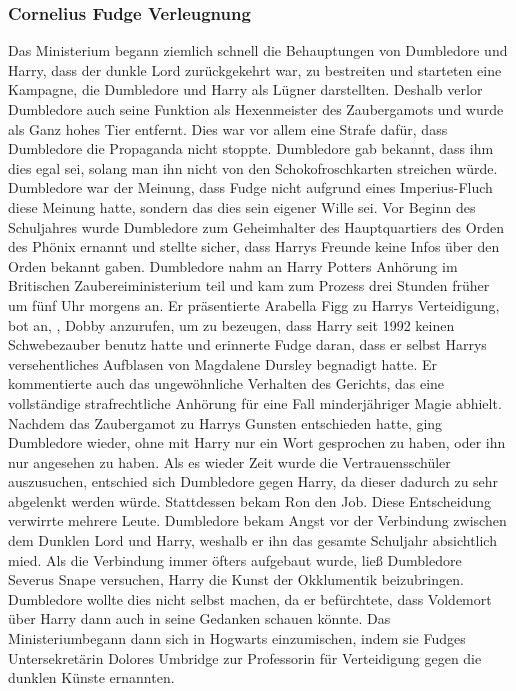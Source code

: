 \documentclass[a4paper, 10pt]{article}
\begin{document}
\subsubsection*{Cornelius Fudge Verleugnung}
Das Ministerium begann ziemlich schnell die Behauptungen von Dumbledore und Harry, dass der dunkle Lord zurückgekehrt war, zu bestreiten und starteten eine Kampagne, die Dumbledore und Harry als Lügner darstellten. Deshalb verlor Dumbledore auch seine Funktion als Hexenmeister des Zaubergamots und wurde als Ganz hohes Tier entfernt. Dies war vor allem eine Strafe dafür, dass Dumbledore die Propaganda nicht stoppte. Dumbledore gab bekannt, dass ihm dies egal sei, solang man ihn nicht von den Schokofroschkarten streichen würde. Dumbledore war der Meinung, dass Fudge nicht aufgrund eines Imperius-Fluch diese Meinung hatte, sondern das dies sein eigener Wille sei.
\vspace{10pt}
\newline
Vor Beginn des Schuljahres wurde Dumbledore zum Geheimhalter des Hauptquartiers des Orden des Phönix ernannt und stellte sicher, dass Harrys Freunde keine Infos über den Orden bekannt gaben.
\vspace{10pt}
\newline
Dumbledore nahm an Harry Potters Anhörung im Britischen Zaubereiministerium teil und kam zum Prozess drei Stunden früher um fünf Uhr morgens an. Er präsentierte Arabella Figg zu Harrys Verteidigung, bot an, , Dobby anzurufen, um zu bezeugen, dass Harry seit 1992 keinen Schwebezauber benutz hatte und erinnerte Fudge daran, dass er selbst Harrys versehentliches Aufblasen von Magdalene Dursley begnadigt hatte. Er kommentierte auch das ungewöhnliche Verhalten des Gerichts, das eine vollständige strafrechtliche Anhörung für eine Fall minderjähriger Magie abhielt. Nachdem das Zaubergamot zu Harrys Gunsten entschieden hatte, ging Dumbledore wieder, ohne mit Harry nur ein Wort gesprochen zu haben, oder ihn nur angesehen zu haben.
\vspace{10pt}
\newline
Als es wieder Zeit wurde die Vertrauensschüler auszusuchen, entschied sich Dumbledore gegen Harry, da dieser dadurch zu sehr abgelenkt werden würde. Stattdessen bekam Ron den Job. Diese Entscheidung verwirrte mehrere Leute.
\vspace{10pt}
\newline
Dumbledore bekam Angst vor der Verbindung zwischen dem Dunklen Lord und Harry, weshalb er ihn das gesamte Schuljahr absichtlich mied. Als die Verbindung immer öfters aufgebaut wurde, ließ Dumbledore Severus Snape versuchen, Harry die Kunst der Okklumentik beizubringen. Dumbledore wollte dies nicht selbst machen, da er befürchtete, dass Voldemort über Harry dann auch in seine Gedanken schauen könnte. Das Ministeriumbegann dann sich in Hogwarts einzumischen, indem sie Fudges Untersekretärin Dolores Umbridge zur Professorin für Verteidigung gegen die dunklen Künste ernannten.
\end{document}
